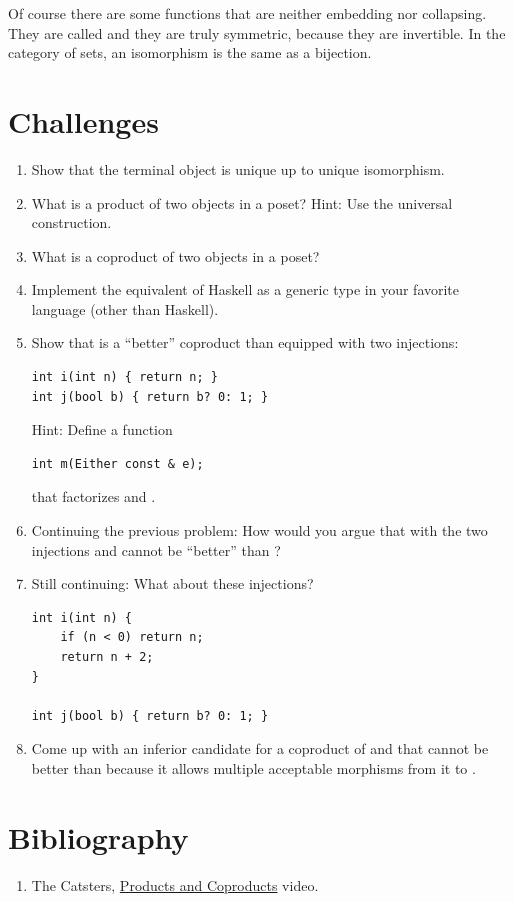 Of course there are some functions that are neither embedding nor
collapsing. They are called  and they are truly
symmetric, because they are invertible. In the category of sets, an
isomorphism is the same as a bijection.

\section{Challenges}\label{challenges}

\begin{enumerate}
\tightlist
\item
  Show that the terminal object is unique up to unique isomorphism.
\item
  What is a product of two objects in a poset? Hint: Use the universal
  construction.
\item
  What is a coproduct of two objects in a poset?
\item
  Implement the equivalent of Haskell  as a generic type
  in your favorite language (other than Haskell).
\item
  Show that  is a ``better'' coproduct than 
  equipped with two injections:

\begin{Verbatim}
int i(int n) { return n; }
int j(bool b) { return b? 0: 1; }
\end{Verbatim}

  Hint: Define a function

\begin{Verbatim}
int m(Either const & e);
\end{Verbatim}

  that factorizes  and .
\item
  Continuing the previous problem: How would you argue that 
  with the two injections  and  cannot be ``better''
  than ?
\item
  Still continuing: What about these injections?

\begin{Verbatim}
int i(int n) { 
    if (n < 0) return n;
    return n + 2;
}

int j(bool b) { return b? 0: 1; }
\end{Verbatim}
\item
  Come up with an inferior candidate for a coproduct of  and
   that cannot be better than  because it
  allows multiple acceptable morphisms from it to .
\end{enumerate}

\section{Bibliography}\label{bibliography}

\begin{enumerate}
\tightlist
\item
  The Catsters,
  \href{https://www.youtube.com/watch?v=upCSDIO9pjc}{Products and
  Coproducts} video.
\end{enumerate}